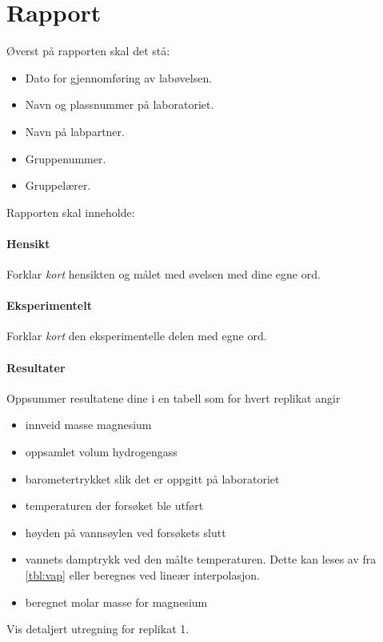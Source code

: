 	\clearpage
	
	\section{Rapport}
	Øverst på rapporten skal det stå:
	\begin{itemize}
		\item Dato for gjennomføring av labøvelsen.
		\item Navn og plassnummer på laboratoriet.
		\item Navn på labpartner.
		\item Gruppenummer.
		\item Gruppelærer.
	\end{itemize}
	
	Rapporten skal inneholde:
	
	\paragraph{Hensikt}
	Forklar \emph{kort} hensikten og målet med øvelsen med dine egne ord.
	
	\paragraph{Eksperimentelt}
	Forklar \emph{kort} den eksperimentelle delen med egne ord.
	
	\paragraph{Resultater}
	Oppsummer resultatene dine i en tabell som for hvert replikat angir
	\begin{itemize}
		\item innveid masse magnesium
		\item oppsamlet volum hydrogengass
		\item barometertrykket slik det er oppgitt på laboratoriet
		\item temperaturen der forsøket ble utført
		\item høyden på vannsøylen ved forsøkets slutt
		\item vannets damptrykk ved den målte temperaturen. Dette kan leses av fra \cref{tbl:vap} eller beregnes ved lineær interpolasjon.
		\item beregnet molar masse for magnesium
	\end{itemize}
	
	Vis detaljert utregning for replikat 1.
	
